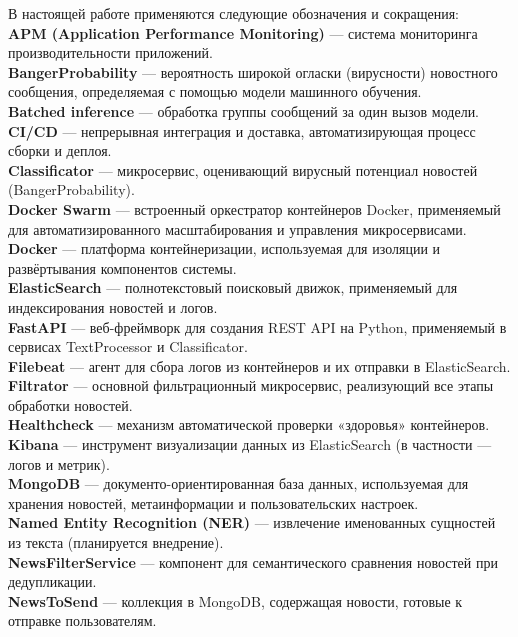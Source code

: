 В настоящей работе применяются следующие обозначения и сокращения:\\
\textbf{APM (Application Performance Monitoring)} — система мониторинга производительности приложений.\\
\textbf{BangerProbability} — вероятность широкой огласки (вирусности) новостного сообщения, определяемая с помощью модели машинного обучения.\\
\textbf{Batched inference} — обработка группы сообщений за один вызов модели.\\
\textbf{CI/CD} — непрерывная интеграция и доставка, автоматизирующая процесс сборки и деплоя.\\
\textbf{Classificator} — микросервис, оценивающий вирусный потенциал новостей (BangerProbability).\\
\textbf{Docker Swarm} — встроенный оркестратор контейнеров Docker, применяемый для автоматизированного масштабирования и управления микросервисами.\\
\textbf{Docker} — платформа контейнеризации, используемая для изоляции и развёртывания компонентов системы.\\
\textbf{ElasticSearch} — полнотекстовый поисковый движок, применяемый для индексирования новостей и логов.\\
\textbf{FastAPI} — веб-фреймворк для создания REST API на Python, применяемый в сервисах TextProcessor и Classificator.\\
\textbf{Filebeat} — агент для сбора логов из контейнеров и их отправки в ElasticSearch.\\
\textbf{Filtrator} — основной фильтрационный микросервис, реализующий все этапы обработки новостей.\\
\textbf{Healthcheck} — механизм автоматической проверки «здоровья» контейнеров.\\
\textbf{Kibana} — инструмент визуализации данных из ElasticSearch (в частности — логов и метрик).\\
\textbf{MongoDB} — документо-ориентированная база данных, используемая для хранения новостей, метаинформации и пользовательских настроек.\\
\textbf{Named Entity Recognition (NER)} — извлечение именованных сущностей из текста (планируется внедрение).\\
\textbf{NewsFilterService} — компонент для семантического сравнения новостей при дедупликации.\\
\textbf{NewsToSend} — коллекция в MongoDB, содержащая новости, готовые к отправке пользователям.\\
